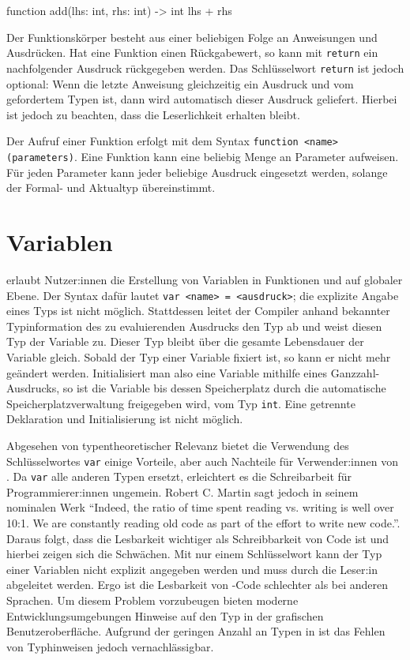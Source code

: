 \begin{ToyaCode}[numbers=none, caption={Eine typische Funktion unter toya.}, label=lst:intro_simplefunction]
function add(lhs: int, rhs: int) -> int {
    lhs + rhs
}
\end{ToyaCode}

Der Funktionskörper besteht aus einer beliebigen Folge an Anweisungen und Ausdrücken. Hat eine Funktion einen Rückgabewert, so kann mit \texttt{return} ein nachfolgender Ausdruck rückgegeben werden. Das Schlüsselwort \texttt{return} ist jedoch optional: Wenn die letzte Anweisung gleichzeitig ein Ausdruck und vom gefordertem Typen ist, dann wird automatisch dieser Ausdruck geliefert. Hierbei ist jedoch zu beachten, dass die Leserlichkeit erhalten bleibt.

Der Aufruf einer Funktion erfolgt mit dem Syntax \texttt{function <name>(parameters)}. Eine Funktion kann eine beliebig Menge an Parameter aufweisen. Für jeden Parameter kann jeder beliebige Ausdruck eingesetzt werden, solange der Formal- und Aktualtyp übereinstimmt.


\section{Variablen}
\Toya erlaubt Nutzer:innen die Erstellung von Variablen in Funktionen und auf globaler Ebene. Der Syntax dafür lautet \texttt{var <name> = <ausdruck>}; die explizite Angabe eines Typs ist nicht möglich. Stattdessen leitet der Compiler anhand bekannter Typinformation des zu evaluierenden Ausdrucks den Typ ab und weist diesen Typ der Variable zu. Dieser Typ bleibt über die gesamte Lebensdauer der Variable gleich. Sobald der Typ einer Variable fixiert ist, so kann er nicht mehr geändert werden. Initialisiert man also eine Variable mithilfe eines Ganzzahl-Ausdrucks, so ist die Variable bis dessen Speicherplatz durch die automatische Speicherplatzverwaltung freigegeben wird, vom Typ \texttt{int}. Eine getrennte Deklaration und Initialisierung ist nicht möglich.

Abgesehen von typentheoretischer Relevanz bietet die Verwendung des Schlüsselwortes \texttt{var} einige Vorteile, aber auch Nachteile für Verwender:innen von \toya. Da \texttt{var} alle anderen Typen ersetzt, erleichtert es die Schreibarbeit für Programmierer:innen ungemein. Robert C. Martin sagt jedoch in seinem nominalen Werk \textcite{martin2009clean} ``Indeed, the ratio of time spent reading vs. writing is well over 10:1. We are constantly reading old code as part of the effort to write new code.''. Daraus folgt, dass die Lesbarkeit wichtiger als Schreibbarkeit von Code ist und hierbei zeigen sich die Schwächen. Mit nur einem Schlüsselwort kann der Typ einer Variablen nicht explizit angegeben werden und muss durch die Leser:in abgeleitet werden. Ergo ist die Lesbarkeit von \toya-Code schlechter als bei anderen Sprachen. Um diesem Problem vorzubeugen bieten moderne Entwicklungsumgebungen Hinweise auf den Typ in der grafischen Benutzeroberfläche. Aufgrund der geringen Anzahl an Typen in \toya ist das Fehlen von Typhinweisen jedoch vernachlässigbar.

